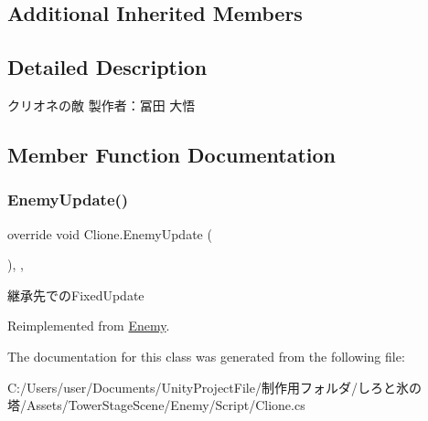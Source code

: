 \subsection*{Additional Inherited Members}


\subsection{Detailed Description}
クリオネの敵 製作者：冨田 大悟 



\subsection{Member Function Documentation}
\mbox{\label{class_clione_a59ce5c64ae6b106a6ef39dd5773ebafc}} 
\subsubsection{\texorpdfstring{Enemy\+Update()}{EnemyUpdate()}}
{\footnotesize\ttfamily override void Clione.\+Enemy\+Update (\begin{DoxyParamCaption}{ }\end{DoxyParamCaption})\hspace{0.3cm}{\ttfamily [inline]}, {\ttfamily [protected]}, {\ttfamily [virtual]}}



継承先での\+Fixed\+Update 



Reimplemented from \hyperlink{class_enemy_ab19a73003a5b443ba93f4b6a45c0abad}{Enemy}.



The documentation for this class was generated from the following file\+:\begin{DoxyCompactItemize}
\item 
C\+:/\+Users/user/\+Documents/\+Unity\+Project\+File/制作用フォルダ/しろと氷の塔/\+Assets/\+Tower\+Stage\+Scene/\+Enemy/\+Script/Clione.\+cs\end{DoxyCompactItemize}
